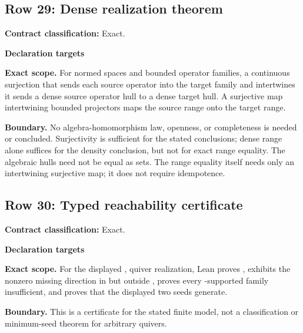 \subsection{Row 29: Dense realization theorem}
\label{row:29}
\textbf{Contract classification:} Exact.
\par\smallskip\textbf{Declaration targets}\par
{\small\noindent{}\par}
{\small\noindent{}\par}
\medskip\noindent\textbf{Exact scope.} For normed spaces and bounded operator families, a continuous surjection that sends each source operator into the target family and intertwines it sends a dense source operator hull to a dense target hull. A surjective map intertwining bounded projectors maps the source range onto the target range.
\par\smallskip\noindent\textbf{Boundary.} No algebra-homomorphism law, openness, or completeness is needed or concluded. Surjectivity is sufficient for the stated conclusions; dense range alone suffices for the density conclusion, but not for exact range equality. The algebraic hulls need not be equal as sets. The range equality itself needs only an intertwining surjective map; it does not require idempotence.
\medskip
\subsection{Row 30: Typed reachability certificate}
\label{row:30}
\textbf{Contract classification:} Exact.
\par\smallskip\textbf{Declaration targets}\par
{\small\noindent{}\par}
\medskip\noindent\textbf{Exact scope.} For the displayed ,  quiver realization, Lean proves , exhibits the nonzero missing direction in  but outside , proves every -supported family insufficient, and proves that the displayed two seeds generate.
\par\smallskip\noindent\textbf{Boundary.} This is a certificate for the stated finite model, not a classification or minimum-seed theorem for arbitrary quivers.
\medskip
